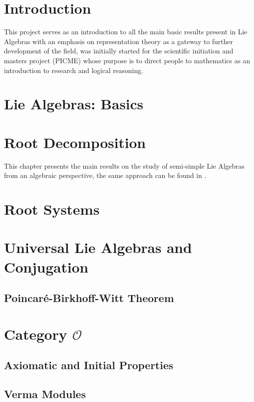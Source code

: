 \documentclass[svgnames,12pt,oneside, openright,a4paper]{scrbook}
\newcommand{\bggO}{\mathcal{O}}
\begin{document}

 \tableofcontents
\chapter*{Introduction}
This project serves as an introduction to all the main basic results present in Lie Algebras with an emphasis on representation theory as a gateway to further development of the field, was initially started for the scientific initiation and masters project (PICME) whose purpose is to direct people to mathematics as an introduction to research and logical reasoning.
\chapter{Lie Algebras: Basics}






\chapter{Root Decomposition}
This chapter presents the main results on the study of semi-simple Lie Algebras from an algebraic perspective, the same approach can be found in \cite{humphreys1}.




\chapter{Root Systems}



\chapter{Universal Lie Algebras and Conjugation}

\section{Poincaré-Birkhoff-Witt Theorem}
\chapter{Category $\bggO$}
\section{Axiomatic and Initial Properties}
\section{Verma Modules}
\end{document}
